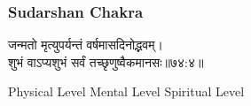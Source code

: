 \subsubsection{Sudarshan Chakra}
\begin{sanskrit}
	\begin{center}
		जन्मतो मृत्युपर्यन्तं वर्षमासदिनोद्भवम्।\\शुभं वाऽप्यशुभं सर्वं तच्छृणुष्वैकमानसः॥७४:४॥\cite{BrihatParasharHoraShastraVol2}\cite{wiki:bphs}
	\end{center}
\end{sanskrit}
Physical Level
Mental Level
Spiritual Level
